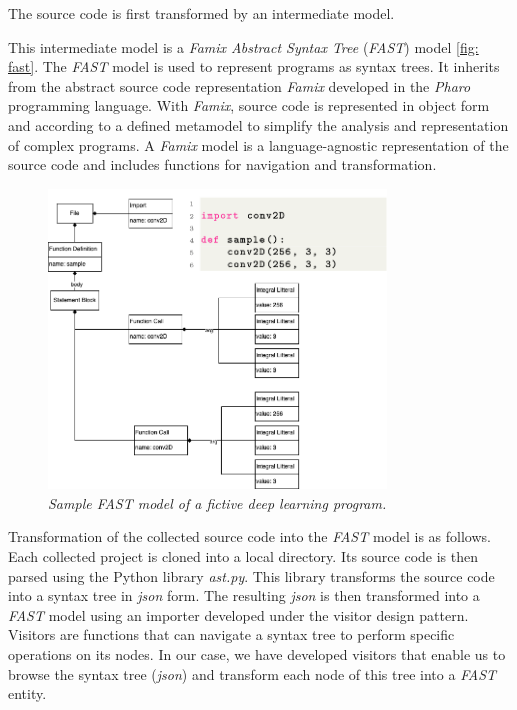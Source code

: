 The source code is first transformed by an intermediate model.



This intermediate model is a \emph{Famix Abstract Syntax Tree} (\emph{FAST}) model \ref{fig: fast}. The \emph{FAST} model is used to represent programs as syntax trees. It inherits from the abstract source code representation \emph{Famix} developed in the \emph{Pharo} programming language. With \emph{Famix}, source code is represented in object form and according to a defined metamodel to simplify the analysis and representation of complex programs. A \emph{Famix} model is a language-agnostic representation of the source code and includes functions for navigation and transformation.\\

\begin{figure}[h]
  \centering
  \includegraphics[width=0.8\textwidth]{figure/fast.png}
  \caption{\emph{Sample \emph{FAST} model of a fictive deep learning program.}}
  \label{fig:fast}
\end{figure}

Transformation of the collected source code into the \emph{FAST} model is as
follows. Each collected project is cloned into a local directory. Its source
code is then parsed using the Python library \emph{ast.py}. This library
transforms the source code into a syntax tree in \emph{json} form. The resulting
\emph{json} is then transformed into a \emph{FAST} model using an importer
developed under the visitor design pattern. Visitors are functions that can
navigate a syntax tree to perform specific operations on its nodes. In our case,
we have developed visitors that enable us to browse the syntax tree
(\emph{json}) and transform each node of this tree into a \emph{FAST} entity.

